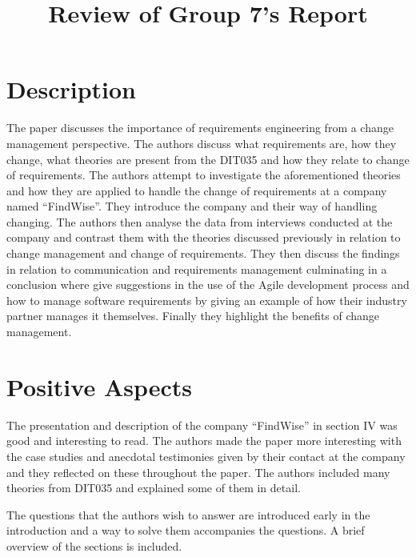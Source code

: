 \documentclass[conference]{IEEEtran}
\begin{document}
%
\title{Review of Group 7's Report}

\author{

}

\maketitle

\section{Description}
The paper discusses the importance of requirements engineering from a change management perspective. The authors discuss what requirements are, how they change, what theories are present from the DIT035 and how they relate to change of requirements. The authors attempt to investigate the aforementioned theories and how they are applied to handle the change of requirements at a company named ``FindWise''. They introduce the company and their way of handling changing. The authors then analyse the data from interviews conducted at the company and contrast them with the theories discussed previously in relation to change management and change of requirements. They then discuss the findings in relation to communication and requirements management culminating in a conclusion where give suggestions in the use of the Agile development process and how to manage software requirements by giving an example of how their industry partner manages it themselves. Finally they highlight the benefits of change management. 
\section{Positive Aspects}
The presentation and description of the company ``FindWise'' in section IV was good and interesting to read. The authors made the paper more interesting with the case studies and anecdotal testimonies given by their contact at the company and they reflected on these throughout the paper. The authors included many theories from DIT035 and explained some of them in detail.

The questions that the authors wish to answer are introduced early in the introduction and a way to solve them accompanies the questions. A brief overview of the sections is included. 
\end{document}
